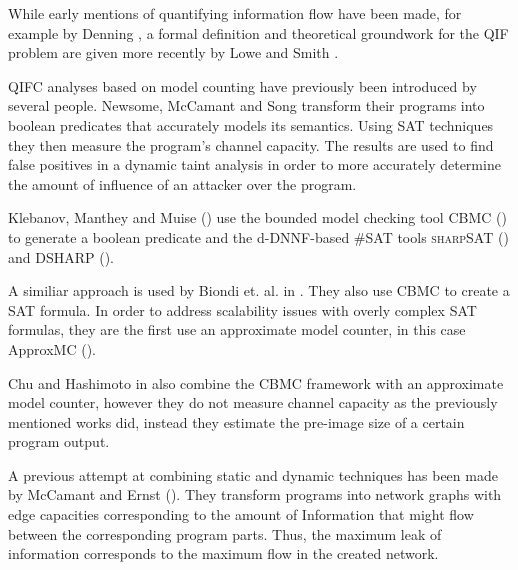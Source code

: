 While early mentions of quantifying information flow have been made, for example by Denning \cite{denning82}, a formal definition and theoretical groundwork for the QIF problem are given more recently by Lowe \cite{lowe02} and Smith \cite{smith09}.

QIFC analyses based on model counting have previously been introduced by several people.
Newsome, McCamant and Song \cite{newsome09} transform their programs into boolean predicates that accurately models its semantics. Using SAT techniques they then measure the program's channel capacity. The results are used to find false positives in a dynamic taint analysis in order to more accurately determine the amount of influence of an attacker over the program.

Klebanov, Manthey and Muise (\cite{klebanov13}) use the bounded model checking tool CBMC (\cite{cbmc}) to generate a boolean predicate and the d-DNNF-based \#SAT tools \textsc{sharp}SAT (\cite{thurley06}) and \textsc{DSHARP} (\cite{muise12}).

A similiar approach is used by Biondi et. al. in \cite{biondi18}. They also use CBMC to create a SAT formula. In order to address scalability issues with overly complex SAT formulas, they are the first use an approximate model counter, in this case ApproxMC (\cite{chakraborty13}).

Chu and Hashimoto in \cite{chu19} also combine the CBMC framework with an approximate model counter, however they do not measure channel capacity as the previously mentioned works did, instead they estimate the pre-image size of a certain program output.

A previous attempt at combining static and dynamic techniques has been made by McCamant and Ernst (\cite{mccamant08}). They transform programs into network graphs with edge capacities corresponding to the amount of Information that might flow between the corresponding program parts. Thus, the maximum leak of information corresponds to the maximum flow in the created network. 

